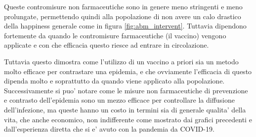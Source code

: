 Queste contromisure non farmaceutiche sono in genere meno stringenti e meno prolungate, permettendo quindi
alla popolazione di non avere un calo drastico della happiness generale come in figura \ref{fig:abm_intervent}.
Tuttavia dipendono fortemente da quando le contromisure farmaceutiche (il vaccino) vengono applicate
e con che efficacia questo riesce ad entrare in circolazione. 

Tuttavia questo dimostra come l'utilizzo di un vaccino a priori sia un metodo molto efficace per contrastare
una epidemia, e che ovviamente l'efficacia di questo dipenda molto e soprattutto da quando viene applicato 
alla popolazione. Successivamente si puo' notare come le misure non farmaceutiche di prevenzione e contrasto
dell'epidemia sono un mezzo efficace per controllare la diffusione dell'infezione, ma queste hanno un costo 
in termini sia di generale qualita' della vita, che anche economico, non indifferente come mostrato dai grafici 
precedenti e dall'esperienza diretta che si e' avuto con la pandemia da COVID-19. 